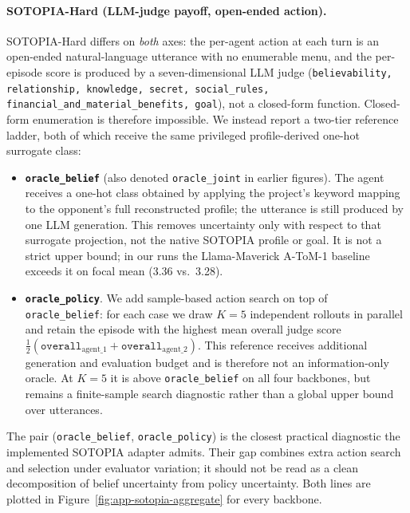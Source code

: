 \paragraph{SOTOPIA-Hard (LLM-judge payoff, open-ended action).} SOTOPIA-Hard \citep{zhou2024sotopia} differs on \emph{both} axes: the per-agent action at each turn is an open-ended natural-language utterance with no enumerable menu, and the per-episode score is produced by a seven-dimensional LLM judge (\texttt{believability, relationship, knowledge, secret, social\_rules, financial\_and\_material\_benefits, goal}), not a closed-form function. Closed-form enumeration is therefore impossible. We instead report a two-tier reference ladder, both of which receive the same privileged profile-derived one-hot surrogate class:
\begin{itemize}\setlength{\itemsep}{2pt}
\item \textbf{\texttt{oracle\_belief}} (also denoted \texttt{oracle\_joint} in earlier figures). The agent receives a one-hot class obtained by applying the project's keyword mapping to the opponent's full reconstructed profile; the utterance is still produced by one LLM generation. This removes uncertainty only with respect to that surrogate projection, not the native SOTOPIA profile or goal. It is not a strict upper bound; in our runs the Llama-Maverick A-ToM-1 baseline exceeds it on focal mean (3.36 vs.\ 3.28).
\item \textbf{\texttt{oracle\_policy}}. We add sample-based action search on top of \texttt{oracle\_belief}: for each case we draw $K{=}5$ independent rollouts in parallel and retain the episode with the highest mean overall judge score $\tfrac{1}{2}(\texttt{overall}_{\text{agent\_1}}{+}\texttt{overall}_{\text{agent\_2}})$. This reference receives additional generation and evaluation budget and is therefore not an information-only oracle. At $K{=}5$ it is above \texttt{oracle\_belief} on all four backbones, but remains a finite-sample search diagnostic rather than a global upper bound over utterances.
\end{itemize}
The pair (\texttt{oracle\_belief}, \texttt{oracle\_policy}) is the closest practical diagnostic the implemented SOTOPIA adapter admits. Their gap combines extra action search and selection under evaluator variation; it should not be read as a clean decomposition of belief uncertainty from policy uncertainty. Both lines are plotted in Figure~\ref{fig:app-sotopia-aggregate} for every backbone.

